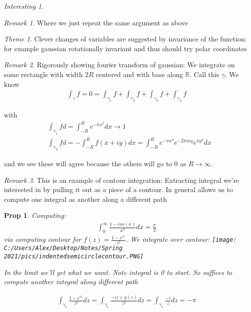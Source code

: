 \documentclass[11pt]{article}
\newcommand{\R}{\mathbb{R}}
\newtheorem{prop}{Prop}
\theoremstyle{remark}
\newtheorem{remark}{Remark}
\newtheorem{interest}{Interesting}
\newtheorem{theme}{Theme}
\begin{document}
\begin{interest}
\begin{remark}
	Where we just repeat the same argument as above
\end{remark}

\begin{theme}
	Clever changes of variables are suggested by invariance of the function: for example gaussian rotationally invariant and thus should try polar coordinates
\end{theme}

\begin{remark}
	Rigorously showing fourier transform of gaussian:
	We integrate on some rectangle with width $2R$ centered and with base along $\R$. Call this $\gamma$. We know
	\begin{align*}
		\int_{\gamma} f = 0 = \int_{\gamma_1} f+ \int_{\gamma_2} f + \int_{\gamma_3} f + \int_{\gamma_4} f
	\end{align*}

	with 
	\begin{align*}
		&\int_{\gamma_1} f d = \int_{-R}^R e^{-\pi x^2}dx \to 1\\
		&\int_{\gamma_3} f d = -\int_{-R}^R f(x+iy)dx = \int_{-R}^R e^{-\pi x^2}e^{-2 \pi i xy}e^{\pi y^2} dx
	\end{align*}

	and we see these will agree because the others will go to 0 as $R \to \infty$. 
\end{remark}

\begin{remark}
	This is an example of contour integration: Extracting integral we're interested in by pulling it out as a piece of a contour. In general allows us to compute one integral as another along a different path
\end{remark}

\begin{prop}
	Computing:
	\begin{align*}
		\int_0^{\infty} \frac{1-cos(x)}{x^2}dx = \frac{\pi}{2}
	\end{align*}
	via computing contour for $f(z) = \frac{1-e^{iz}}{z^2}$. We integrate over contour:
	\texttt{[image: C:/Users/Alex/Desktop/Notes/Spring 2021/pics/indentedsemicirclecontour.PNG]}

	In the limit we'll get what we want. Note integral is 0 to start. So suffices to compute another integral along different path

	\begin{align*}
		\int_{\gamma_{\epsilon}} \frac{1-e^{iz}}{z^2}dz = \int_{\gamma_{\epsilon}} \frac{-iz + g(z)}{z^2}dz = \int_{\gamma_{\epsilon}} \frac{-i}{z}dz = - \pi
	\end{align*}


\end{prop}
\end{interest}
\end{document}
